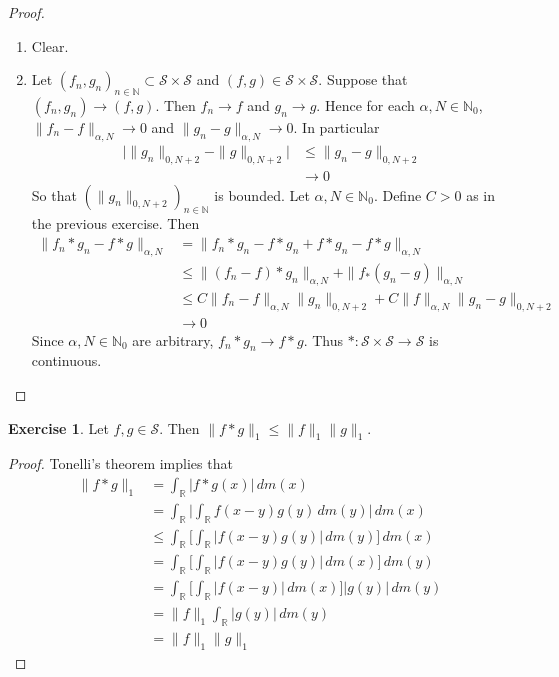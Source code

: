 \documentclass[12pt]{amsart}
\theoremstyle{definition}
\newtheorem{ex}[definition]{Exercise}
\newcommand{\al}{\alpha}
\newcommand{\N}{\mathbb{N}}
\newcommand{\R}{\mathbb{R}}
\newcommand{\MS}{\mathcal{S}}
\newcommand{\dm}{\, d m}
\begin{document}
	\begin{proof}\
		\begin{enumerate}
			\item Clear.
			\item Let $(f_n,g_n)_{n \in \N} \subset \MS \times \MS$ and $(f,g) \in \MS \times \MS$. Suppose that $(f_n, g_n) \rightarrow (f,g)$. Then $f_n \rightarrow f$ and $g_n \rightarrow g$. Hence for each $\al, N \in \N_0$, $\|f_n - f\|_{\al, N} \rightarrow 0$ and $\|g_n - g\|_{\al, N} \rightarrow 0$. In particular 
			\begin{align*}
				\bigg|\|g_n\|_{0,N+2} - \|g\|_{0, N+2} \bigg| 
				& \leq \|g_n - g\|_{0, N+2}  \\
				& \rightarrow 0
			\end{align*}
			So that $(\|g_n\|_{0,N+2})_{n \in \N}$ is bounded.
			Let $\al,N \in \N_0$. Define $C >0$ as in the previous exercise. Then 
			\begin{align*}
				\|f_n *g_n - f*g\|_{\al,N} 
				& = \|f_n *g_n - f*g_n + f*g_n - f*g\|_{\al,N} \\ 
				& \leq \|(f_n -f )*g_n\|_{\al,N} + \|f_ *(g_n -g)\|_{\al,N} \\
				& \leq C\|f_n -f\|_{\al,N}\|g_n\|_{0, N+2} + C\|f\|_{\al,N}\|g_n-g\|_{0, N+2} \\
				& \rightarrow 0
			\end{align*}
			Since $\al,N \in \N_0$ are arbitrary, $f_n *g_n \rightarrow f*g$. Thus $*:\MS \times \MS \rightarrow \MS$ is continuous.
		\end{enumerate}
	\end{proof}

	\begin{ex}
		Let $f,g \in \MS$. Then $\|f*g\|_1 \leq \|f\|_1\|g\|_1$.
	\end{ex}

	\begin{proof}
		Tonelli's theorem implies that 
		\begin{align*}
			\|f*g\|_1
			& = \int_{\R} |f*g(x)| \dm(x) \\
			& = \int_{\R}  \bigg|\int_{\R} f(x-y)g(y) \dm(y) \bigg|  \dm(x) \\
			& \leq  \int_{\R} \bigg[ \int_{\R} |f(x-y)g(y)| \dm(y) \bigg] \dm(x) \\
			& = \int_{\R} \bigg[ \int_{\R} |f(x-y)g(y)| \dm(x) \bigg] \dm(y) \\
			& = \int_{\R} \bigg[ \int_{\R} |f(x-y)| \dm(x) \bigg] |g(y)| \dm(y) \\
			& = \|f\|_1 \int_{\R} |g(y)| \dm(y) \\
			& = \|f\|_1\|g\|_1
		\end{align*}
	\end{proof}
\end{document}
